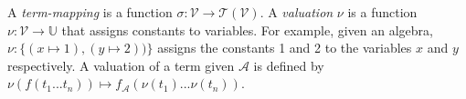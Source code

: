 A \textit{term-mapping} is a function $\sigma:\mathcal{V} \rightarrow \mathcal{T}(\mathcal{V})$. A \textit{valuation} $\nu$ is a function $\nu:\mathcal{V} \rightarrow \mathbb{U}$ that assigns constants to variables. For example, given an algebra, $\nu:\{(x \mapsto 1), (y \mapsto 2))\}$ assigns the constants 1 and 2 to the variables $x$ and $y$ respectively.
A valuation of a term given $\mathcal{A}$ is defined by $\nu(f(t_1 ... t_n)) \mapsto f_\mathcal{A}(\nu(t_1) ... \nu(t_n))$.
